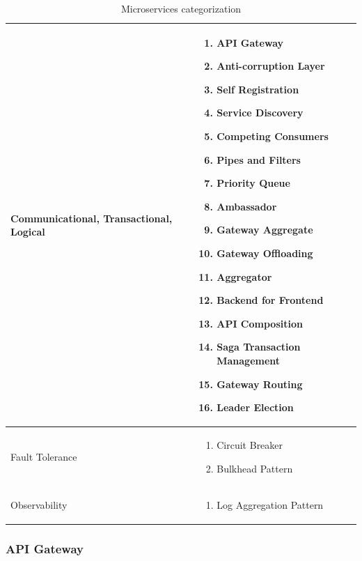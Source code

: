 \documentclass{bmcart}
\begin{document}
\begin{center}
\begin{table}[h]
\begin{tabular}{ | m{3cm} | m{8cm} | }
      Communicational, Transactional, Logical & 
      \begin{enumerate}
          \item API Gateway
          \item Anti-corruption Layer
          \item Self Registration
          \item Service Discovery
          \item Competing Consumers
          \item Pipes and Filters
          \item Priority Queue
          \item Ambassador
          \item Gateway Aggregate
          \item Gateway Offloading
          \item Aggregator
          \item Backend for Frontend
          \item API Composition
          \item Saga Transaction Management
          \item Gateway Routing
          \item Leader Election
      \end{enumerate} 
      \\

      \hline

      Fault Tolerance &
      \begin{enumerate}
          \item Circuit Breaker
          \item Bulkhead Pattern
      \end{enumerate} 
      \\
      \hline

      Observability & 
      \begin{enumerate}
          \item  Log Aggregation Pattern
      \end{enumerate} 
      \\
      \hline


  \end{tabular}
  \caption{Microservices categorization}
  \label{microservices-categorization}
  \end{table}
\end{center}


\subsubsection{API Gateway}
\end{document}
